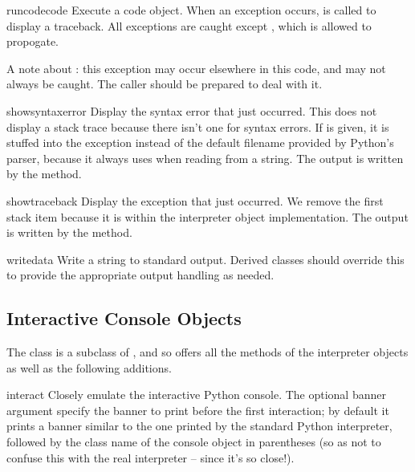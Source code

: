 \begin{methoddesc}{runcode}{code}
Execute a code object.
When an exception occurs,  is called to
display a traceback.  All exceptions are caught except
, which is allowed to propogate.

A note about : this exception may occur
elsewhere in this code, and may not always be caught.  The caller
should be prepared to deal with it.
\end{methoddesc}

\begin{methoddesc}{showsyntaxerror}{}
Display the syntax error that just occurred.  This does not display
a stack trace because there isn't one for syntax errors.
If  is given, it is stuffed into the exception instead
of the default filename provided by Python's parser, because it
always uses  when reading from a string.
The output is written by the  method.
\end{methoddesc}

\begin{methoddesc}{showtraceback}{}
Display the exception that just occurred.  We remove the first stack
item because it is within the interpreter object implementation.
The output is written by the  method.
\end{methoddesc}

\begin{methoddesc}{write}{data}
Write a string to standard output.  Derived classes should override
this to provide the appropriate output handling as needed.
\end{methoddesc}


\subsection{Interactive Console Objects
            \label{console-objects}}

The  class is a subclass of
, and so offers all the methods of the
interpreter objects as well as the following additions.

\begin{methoddesc}{interact}{}
Closely emulate the interactive Python console.
The optional banner argument specify the banner to print before the
first interaction; by default it prints a banner similar to the one
printed by the standard Python interpreter, followed by the class
name of the console object in parentheses (so as not to confuse this
with the real interpreter -- since it's so close!).
\end{methoddesc}

